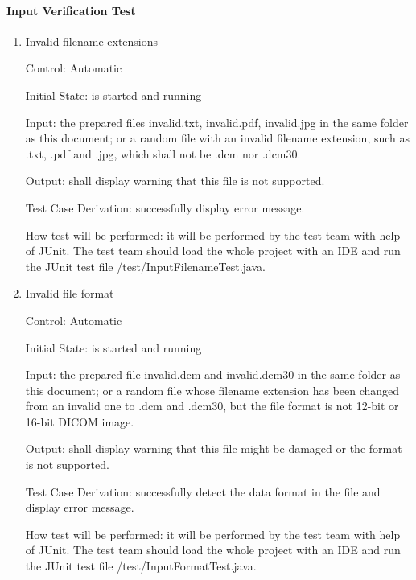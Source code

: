 \documentclass[12pt, titlepage]{article}
\begin{document}
\paragraph{Input Verification Test}

\begin{enumerate}

\item{Invalid filename extensions}

Control: Automatic
					
Initial State: \progname{} is started and running
					
Input: the prepared files invalid.txt, invalid.pdf, invalid.jpg in the same
folder as this document; or a random file with an invalid filename extension,
such as .txt, .pdf and .jpg, which shall not be .dcm nor .dcm30.
					
Output: \progname{} shall display warning that this file is not supported.

Test Case Derivation: successfully display error message.
					
How test will be performed: it will be performed by the test team with help of
JUnit. The test team should load the whole project with an IDE and run the
JUnit test file /test/InputFilenameTest.java. 

					
\item{Invalid file format}

Control: Automatic
					
Initial State: \progname{} is started and running
					
Input: the prepared file invalid.dcm and invalid.dcm30 in the same folder as
this document; or a random file whose filename extension has been changed from
an invalid one to .dcm and .dcm30, but the file format is not 12-bit or 16-bit
DICOM image.
					
Output: \progname{} shall display warning that this file might be damaged or
the format is not supported.

Test Case Derivation: successfully detect the data format in the file and
display error message. 

How test will be performed: it will be performed by the test team with help of
JUnit. The test team should load the whole project with an IDE and run the
JUnit test file /test/InputFormatTest.java. 


\end{enumerate}
\end{document}
